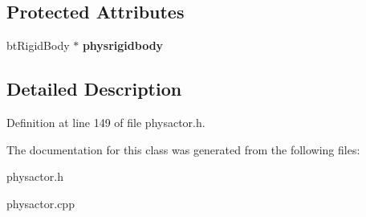 \subsection*{Protected Attributes}
\begin{DoxyCompactItemize}
\item 
\hypertarget{classActorSta_ad12363fc4cd60d6cdd5e3c6d36d96f20}{
btRigidBody $\ast$ {\bfseries physrigidbody}}
\label{d3/daf/classActorSta_ad12363fc4cd60d6cdd5e3c6d36d96f20}

\end{DoxyCompactItemize}


\subsection{Detailed Description}


Definition at line 149 of file physactor.h.

The documentation for this class was generated from the following files:\begin{DoxyCompactItemize}
\item 
physactor.h\item 
physactor.cpp\end{DoxyCompactItemize}
